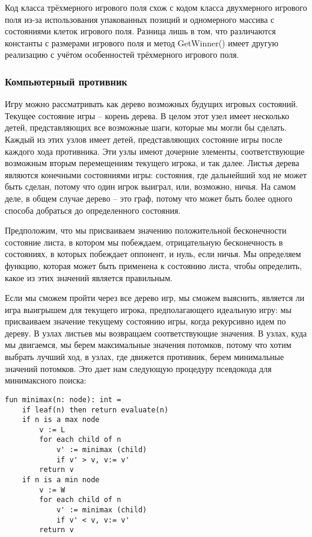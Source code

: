 Код класса трёхмерного игрового поля схож с кодом класса двухмерного игрового поля из-за использования упакованных позиций и одномерного массива с состояниями клеток игрового поля. Разница лишь в том, что различаются константы с размерами игрового поля и метод GetWinner() имеет другую реализацию с учётом особенностей трёхмерного игрового поля.


\subsubsection{Компьютерный противник}

Игру можно рассматривать как дерево возможных будущих игровых состояний. Текущее состояние игры -- корень дерева. В целом этот узел имеет несколько детей, представляющих все возможные шаги, которые мы могли бы сделать. Каждый из этих узлов имеет детей, представляющих состояние игры после каждого хода противника. Эти узлы имеют дочерние элементы, соответствующие возможным вторым перемещениям текущего игрока, и так далее. Листья дерева являются конечными состояниями игры: состояния, где дальнейший ход не может быть сделан, потому что один игрок выиграл, или, возможно, ничья. На самом деле, в общем случае дерево -- это граф, потому что может быть более одного способа добраться до определенного состояния.

Предположим, что мы присваиваем значению положительной бесконечности состояние листа, в котором мы побеждаем, отрицательную бесконечность в состояниях, в которых побеждает оппонент, и нуль, если ничья. Мы определяем функцию, которая может быть применена к состоянию листа, чтобы определить, какое из этих значений является правильным.

Если мы сможем пройти через все дерево игр, мы сможем выяснить, является ли игра выигрышем для текущего игрока, предполагающего идеальную игру: мы присваиваем значение текущему состоянию игры, когда рекурсивно идем по дереву. В узлах листьев мы возвращаем соответствующие значения. В узлах, куда мы двигаемся, мы берем максимальные значения потомков, потому что хотим выбрать лучший ход, в узлах, где движется противник, берем минимальные значений потомков. Это дает нам следующую процедуру псевдокода для минимаксного поиска:

\begin{lstlisting}[caption={Псевдокод алгоритма минимаксного поиска}]
fun minimax(n: node): int =
    if leaf(n) then return evaluate(n)
    if n is a max node
        v := L
        for each child of n
            v' := minimax (child)
            if v' > v, v:= v'
        return v
    if n is a min node
        v := W
        for each child of n
            v' := minimax (child)
            if v' < v, v:= v'
        return v
\end{lstlisting}

